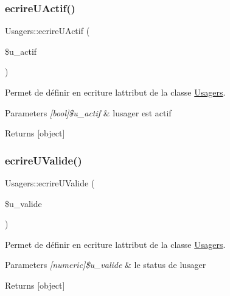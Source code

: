 \subsubsection{\texorpdfstring{ecrire\+U\+Actif()}{ecrireUActif()}}
{\footnotesize\ttfamily Usagers\+::ecrire\+U\+Actif (\begin{DoxyParamCaption}\item[{}]{\$u\+\_\+actif }\end{DoxyParamCaption})}



Permet de définir en ecriture l\textquotesingle{}attribut de la classe \hyperlink{class_usagers}{Usagers}. 


\begin{DoxyParams}{Parameters}
{\em \mbox{[}bool\mbox{]}\$u\+\_\+actif} & l\textquotesingle{}usager est actif \\
\hline
\end{DoxyParams}
\begin{DoxyReturn}{Returns}
\mbox{[}object\mbox{]} 
\end{DoxyReturn}
\mbox{\label{class_usagers_a206b9491cc65669d65b6f03c5439b26c}} 
\subsubsection{\texorpdfstring{ecrire\+U\+Valide()}{ecrireUValide()}}
{\footnotesize\ttfamily Usagers\+::ecrire\+U\+Valide (\begin{DoxyParamCaption}\item[{}]{\$u\+\_\+valide }\end{DoxyParamCaption})}



Permet de définir en ecriture l\textquotesingle{}attribut de la classe \hyperlink{class_usagers}{Usagers}. 


\begin{DoxyParams}{Parameters}
{\em \mbox{[}numeric\mbox{]}\$u\+\_\+valide} & le status de l\textquotesingle{}usager \\
\hline
\end{DoxyParams}
\begin{DoxyReturn}{Returns}
\mbox{[}object\mbox{]} 
\end{DoxyReturn}
\mbox{\label{class_usagers_a181e8f6d45fd3a56b9eefa1435208799}} 
